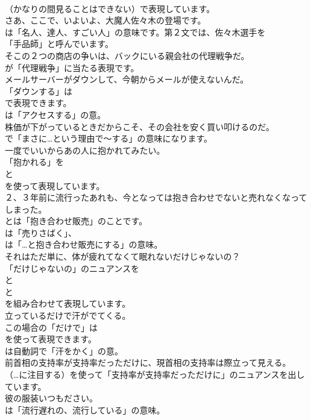 \documentclass[8pt]{extreport}
\begin{document}
\begin{CJK}{UTF8}{min}
\\	（かなりの間見ることはできない）で表現しています。	
\\	さあ、ここで、いよいよ、大魔人佐々木の登場です。 
\\	は「名人、達人、すごい人」の意味です。第２文では、佐々木選手を
\\	「手品師」と呼んでいます。	
\\	そこの２つの商店の争いは、バックにいる親会社の代理戦争だ。 
\\	が「代理戦争」に当たる表現です。	
\\	メールサーバーがダウンして、今朝からメールが使えないんだ。 
\\	「ダウンする」は 
\\	で表現できます。
\\	は「アクセスする」の意。	
\\	株価が下がっているときだからこそ、その会社を安く買い叩けるのだ。 
\\	で「まさに…という理由で～する」の意味になります。	
\\	一度でいいからあの人に抱かれてみたい。 
\\	「抱かれる」を 
\\	と 
\\	を使って表現しています。	
\\	２、３年前に流行ったあれも、今となっては抱き合わせでないと売れなくなってしまった。 
\\	とは「抱き合わせ販売」のことです。
\\	は「売りさばく」、
\\	は「…と抱き合わせ販売にする」の意味。	
\\	それはただ単に、体が疲れてなくて眠れないだけじゃないの？ 
\\	「だけじゃないの」のニュアンスを
\\	と
\\	と 
\\	を組み合わせて表現しています。	
\\	立っているだけで汗がでてくる。 
\\	この場合の「だけで」は
\\	を使って表現できます。
\\	は自動詞で「汗をかく」の意。	
\\	前首相の支持率が支持率だっただけに、現首相の支持率は際立って見える。 
\\	（…に注目する）を使って「支持率が支持率だっただけに」のニュアンスを出しています。	
\\	彼の服装いつもださい。 
\\	は「流行遅れの、流行している」の意味。	

\end{CJK}
\end{document}

